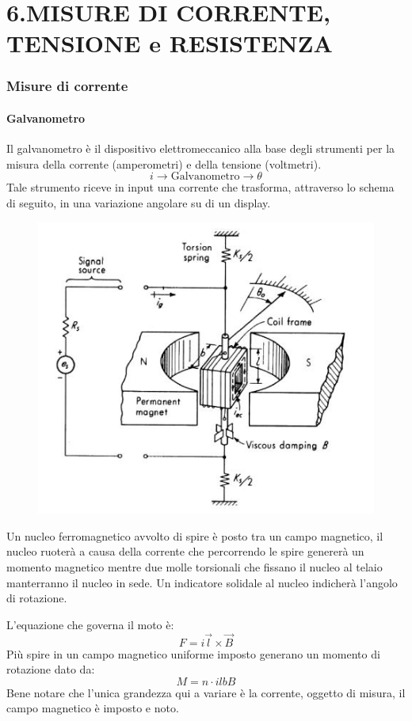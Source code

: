 \documentclass[a4paper, 15pt]{article}
\begin{document}
\setcounter{tocdepth}{5} %
\tableofcontents 
\newpage

\part{6.MISURE DI CORRENTE, TENSIONE e RESISTENZA}
\section{Misure di corrente}
\subsection{Galvanometro}	
\begin{adjustwidth}{2in}{}
		Il galvanometro è il dispositivo elettromeccanico alla base degli strumenti per
		la misura della corrente (amperometri) e della tensione (voltmetri). 
		\[i\rightarrow \boxed{\text{Galvanometro}}\rightarrow\theta \]
		Tale strumento riceve in input una corrente che trasforma, attraverso lo schema di seguito, in una variazione angolare su di un display. 		
		\begin{figure}[H]
			\centering
			\includegraphics[width=0.5\linewidth]{fig/screenshot001}

			\label{fig:screenshot001}
		\end{figure}
		Un nucleo ferromagnetico avvolto di spire è posto tra un campo magnetico, il nucleo ruoterà a causa della corrente che percorrendo le spire genererà un momento magnetico mentre due molle torsionali che fissano il nucleo al telaio manterranno il nucleo in sede. Un indicatore solidale al nucleo indicherà l'angolo di rotazione. \newline 
		
		L'equazione che governa il moto è:
		\[F = i\vec{l}\times \vec{B}\]
		Più spire in un campo magnetico uniforme imposto generano un momento di rotazione dato da:
		\[ M = n\cdot ilbB\]
		Bene notare che l'unica grandezza qui a variare è la corrente, oggetto di misura, il campo magnetico è imposto e noto. \newline 
		

\end{adjustwidth}
\end{document}
